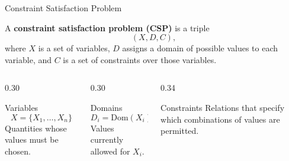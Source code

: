 \documentclass[aspectratio=169,10pt]{beamer}
\begin{document}
\begin{frame}[shrink=20]{Constraint Satisfaction Problem}
  \begin{cpdefinition}
    A \textbf{constraint satisfaction problem (CSP)} is a triple
    \[
      (X,D,C),
    \]
    where $X$ is a set of variables, $D$ assigns a domain of possible values to each variable, and $C$ is a set of constraints over those variables.
  \end{cpdefinition}

  \begin{columns}[T,onlytextwidth]
    \begin{column}{0.30\textwidth}
      \begin{block}{Variables}
        \[
          X=\{X_1,\ldots,X_n\}
        \]
        Quantities whose values must be chosen.
      \end{block}
    \end{column}

    \begin{column}{0.30\textwidth}
      \begin{block}{Domains}
        \[
          D_i=\mathrm{Dom}(X_i)
        \]
        Values currently allowed for $X_i$.
      \end{block}
    \end{column}

    \begin{column}{0.34\textwidth}
      \begin{block}{Constraints}
        Relations that specify which combinations of values are permitted.
      \end{block}
    \end{column}
  \end{columns}
\end{frame}
\end{document}
